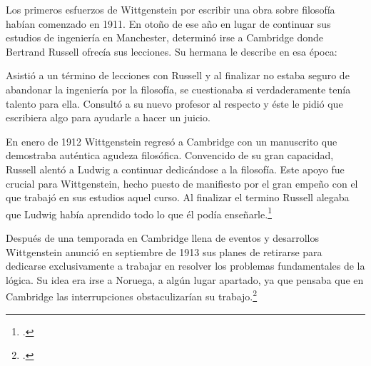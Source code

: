 Los primeros esfuerzos de Wittgenstein por escribir una obra sobre filosofía
habían comenzado en 1911. En otoño de ese año en lugar de continuar sus estudios
de ingeniería en Manchester, determinó irse a Cambridge donde Bertrand Russell
ofrecía sus lecciones. Su hermana le describe en esa época:   

Asistió a un término de lecciones con Russell y al finalizar no estaba seguro de
abandonar la ingeniería por la filosofía, se cuestionaba si verdaderamente tenía
talento para ella. Consultó a su nuevo profesor al respecto y éste le pidió que
escribiera algo para ayudarle a hacer un juicio. 

En enero de 1912 Wittgenstein regresó a Cambridge con un manuscrito que
demostraba auténtica agudeza filosófica. Convencido de su gran capacidad,
Russell alentó a Ludwig a continuar dedicándose a la filosofía. Este
apoyo fue crucial para Wittgenstein, hecho puesto de manifiesto por el gran
empeño con el que trabajó en sus estudios aquel curso. Al finalizar el termino
Russell alegaba que Ludwig había aprendido todo lo que él podía
enseñarle.\footcite[cap. 3 loc 865]{monk} 

Después de una temporada en Cambridge llena de eventos y desarrollos
Wittgenstein anunció en septiembre de 1913 sus planes de retirarse para
dedicarse exclusivamente a trabajar en resolver los problemas fundamentales de
la lógica. Su idea era irse a Noruega, a algún lugar apartado, ya que pensaba
que en Cambridge las interrupciones obstaculizarían su trabajo.\footcite[cap. 4
loc 1844]{monk} 

